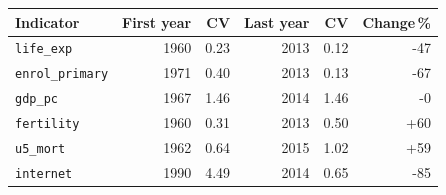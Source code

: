 \small
\begin{tabular}{lrrrrr}
\toprule
Indicator & First year & CV & Last year & CV & Change\,\% \\
\midrule
\texttt{life\_exp} & 1960 & 0.23 & 2013 & 0.12 & -47 \\
\texttt{enrol\_primary} & 1971 & 0.40 & 2013 & 0.13 & -67 \\
\texttt{gdp\_pc} & 1967 & 1.46 & 2014 & 1.46 & -0 \\
\texttt{fertility} & 1960 & 0.31 & 2013 & 0.50 & +60 \\
\texttt{u5\_mort} & 1962 & 0.64 & 2015 & 1.02 & +59 \\
\texttt{internet} & 1990 & 4.49 & 2014 & 0.65 & -85 \\
\bottomrule
\end{tabular}
